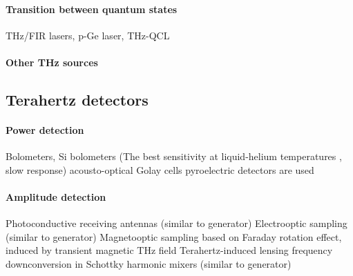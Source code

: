 \paragraph{Transition between quantum states}
 THz/FIR lasers, p-Ge laser, THz-QCL

\paragraph{Other THz sources}


\subsection{Terahertz detectors}
\paragraph{Power detection}
Bolometers, Si bolometers (The best sensitivity at liquid-helium temperatures ,  slow response)
acousto-optical Golay cells
pyroelectric detectors are used

\paragraph{Amplitude detection}
Photoconductive receiving antennas (similar to generator)
Electrooptic sampling (similar to generator)
Magnetooptic sampling based on Faraday rotation effect, induced by transient magnetic THz field
Terahertz-induced lensing 
frequency downconversion in Schottky harmonic mixers (similar to generator)





